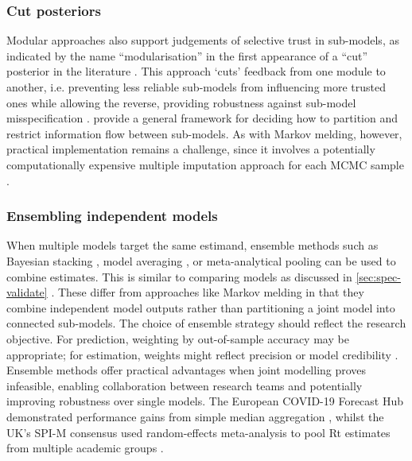 \documentclass{article}
\begin{document}
\subsubsection{Cut posteriors}

Modular approaches also support judgements of selective trust in sub-models, as indicated by the name ``modularisation'' in the first appearance of a ``cut'' posterior in the literature \citep{LiuEtAl2009}. This approach `cuts' feedback from one module to another, i.e. preventing less reliable sub-models from influencing more trusted ones while allowing the reverse, providing robustness against sub-model misspecification \citep{plummer2015cuts,carmona2022scalable,yu2023variational}. \citet{liu2025general} provide a general framework for deciding how to partition and restrict information flow between sub-models. As with Markov melding, however, practical implementation remains a challenge, since it involves a potentially computationally expensive multiple imputation approach for each MCMC sample \citep{plummer2015cuts}.

\subsubsection{Ensembling independent models}\label{sec:ensembling}

When multiple models target the same estimand, ensemble methods such as Bayesian stacking \citep{yao2018using}, model averaging \citep{hoeting1999bayesian}, or meta-analytical pooling \citep{jackson2011multivariate} can be used to combine estimates.
This is similar to comparing models as discussed in \ref{sec:spec-validate} .
These differ from approaches like Markov melding in that they combine independent model outputs rather than partitioning a joint model into connected sub-models.
The choice of ensemble strategy should reflect the research objective.
For prediction, weighting by out-of-sample accuracy may be appropriate; for estimation, weights might reflect precision or model credibility \citep{yao2018using}.
Ensemble methods offer practical advantages when joint modelling proves infeasible, enabling collaboration between research teams and potentially improving robustness over single models.
The European COVID-19 Forecast Hub demonstrated performance gains from simple median aggregation \citep{sherratt2021exploring}, whilst the UK's SPI-M consensus used random-effects meta-analysis to pool Rt estimates from multiple academic groups \citep{manley2024combining}.
\end{document}
